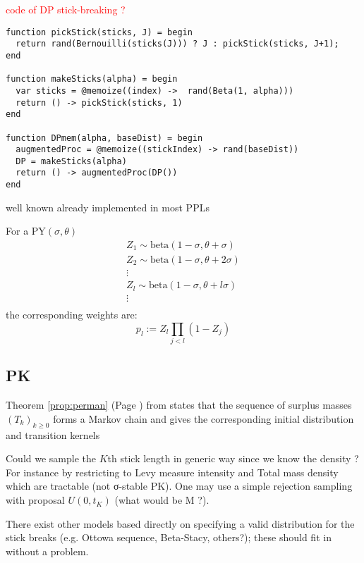 \textcolor{red}{code of DP stick-breaking ?} 
\begin{lstlisting}[caption={\acrlong{DP} stick-breaking representation},captionpos=b,label=code:DP_SB]
function pickStick(sticks, J) = begin
  return rand(Bernouilli(sticks(J))) ? J : pickStick(sticks, J+1);
end

function makeSticks(alpha) = begin
  var sticks = @memoize((index) ->  rand(Beta(1, alpha)))
  return () -> pickStick(sticks, 1)
end

function DPmem(alpha, baseDist) = begin
  augmentedProc = @memoize((stickIndex) -> rand(baseDist))
  DP = makeSticks(alpha)
  return () -> augmentedProc(DP())
end
\end{lstlisting}

well known
already implemented in most \gls{PPL}s

For a $\text{PY}(\sigma, \theta)$
\begin{gather*}
Z_1 \sim \text{beta}(1-\sigma,\theta + \sigma) \\
Z_2 \sim \text{beta}(1-\sigma,\theta + 2\sigma) \\
\vdots \\
Z_l \sim \text{beta}(1-\sigma,\theta + l\sigma) \\
\vdots \\
\end{gather*}
the corresponding weights are:
$$ p_l := Z_l \prod_{j<l}{(1 - Z_j)} $$

\subsection{PK}
Theorem \ref{prop:perman} (Page \pageref{prop:perman}) from \cite{Perman:1992ke} states that the sequence of surplus masses $(T_k)_{k \ge0}$ forms a Markov chain and gives the corresponding initial distribution and transition kernels

Could we sample the $K$th stick length in generic way since we know the density ? For instance by restricting to Levy measure intensity and Total mass density which are tractable (not σ-stable PK). One may use a simple rejection sampling with proposal $U(0, t_K)$ (what would be M ?).

There exist other models based directly on specifying a valid distribution for the stick breaks (e.g. Ottowa sequence, Beta-Stacy, others?); these should fit in without a problem.



